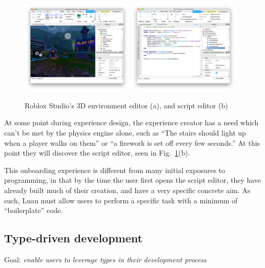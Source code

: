 \documentclass[acmsmall]{acmart}
\begin{document}
\begin{figure}
\includegraphics[width=0.48\textwidth]{studio-mow.png}
\includegraphics[width=0.48\textwidth]{studio-script-editor.png}
\caption{Roblox Studio's 3D environment editor (a), and script editor (b)}
\label{fig:studio}
\end{figure}

At some point during experience design, the experience creator has a need
which can't be met by the physics engine alone, such as ``The stairs should
light up when a player walks on them'' or ``a firework is set off
every few seconds.'' At this point they will discover the script
editor, seen in Fig.~\ref{fig:studio}(b).

This onboarding experience is different from many initial exposures to
programming, in that by the time the user first opens the script
editor, they have already built much of their creation, and have a
very specific concrete aim. As such, Luau must allow users to perform a
specific task with a minimum of ``boilerplate'' code.

\subsection{Type-driven development}

Goal: \emph{enable users to leverage types in their development process}
\end{document}
